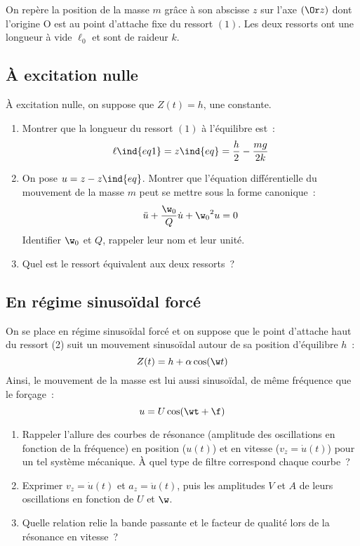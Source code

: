 \documentclass[a4paper, 11pt, final, garamond]{book}
\begin{document}
On repère la position de la masse $m$ grâce à son abscisse $z$ sur l'axe $(\Or
z)$ dont l'origine O est au point d'attache fixe du ressort $(1)$. Les deux
ressorts ont une longueur à vide $\ell_0$ et sont de raideur $k$.

\subsection{À excitation nulle}

À excitation nulle, on suppose que $Z(t) = h$, une constante. 

\begin{enumerate}[label=\clenumi]
    \item Montrer que la longueur du ressort $(1)$ à l'équilibre est~: 
        \[
            \ell\ind{eq1} = z\ind{eq} = \frac{h}{2} - \frac{mg}{2k}
        \]
    \item On pose $u = z-z\ind{eq}$. Montrer que l'équation différentielle du
        mouvement de la masse $m$ peut se mettre sous la forme canonique~: 
        \[
            \ddot{u} + \frac{\w_0}{Q} \dot{u} + {\w_0}^2 u = 0
        \]
        Identifier $\w_0$ et $Q$, rappeler leur nom et leur unité.
    \item Quel est le ressort équivalent aux deux ressorts~?
\end{enumerate}

\subsection{En régime sinusoïdal forcé}

On se place en régime sinusoïdal forcé et on suppose que le point d'attache haut
du ressort (2) suit un mouvement sinusoïdal autour de sa position d'équilibre
$h$~: 
\[
    Z(t) = h + \alpha \cos(\w t)
\]
Ainsi, le mouvement de la masse est lui aussi sinusoïdal, de même fréquence que
le forçage~:
\[u = U\cos(\wt+\f)\]

\begin{enumerate}[label=\clenumi, resume]
    \item Rappeler l'allure des courbes de résonance (amplitude des oscillations
        en fonction de la fréquence) en position ($u(t)$) et en vitesse ($v_z =
        \dot{u}(t)$) pour un tel système mécanique. À quel type de filtre
        correspond chaque courbe~?
    \item Exprimer $v_z = \dot{u}(t)$ et $a_z = \ddot{u}(t)$, puis les
        amplitudes $V$ et $A$ de leurs oscillations en fonction de $U$ et $\w$.
    \item Quelle relation relie la bande passante et le facteur de qualité lors
        de la résonance en vitesse~?
\end{enumerate}
\end{document}
